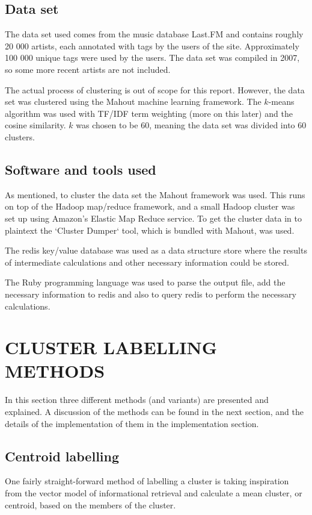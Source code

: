 \documentclass[letterpaper, 10 pt, conference]{ieeeconf}
\begin{document}
\subsection{Data set}
The data set used comes from the music database Last.FM and contains roughly
20 000 artists, each annotated with tags by the users of the site. Approximately
100 000 unique tags were used by the users. The data set was compiled in 2007,
so some more recent artists are not included.\cite{Lamere2010LastFm}

The actual process of clustering is out of scope for this report. However, the
data set was clustered using the Mahout machine learning framework. The
$k$-means algorithm was used with TF/IDF term weighting (more on this later) and
the cosine similarity. $k$ was chosen to be 60, meaning the data set was
divided into 60 clusters.

\subsection{Software and tools used}
As mentioned, to cluster the data set the Mahout framework was used. This runs
on top of the Hadoop map/reduce framework, and a small Hadoop cluster was set up
using Amazon's Elastic Map Reduce service. To get the cluster data in to
plaintext the `Cluster Dumper` tool, which is bundled with Mahout, was used.

The redis key/value database was used as a data structure store where the
results of intermediate calculations and other necessary information could be
stored.

The Ruby programming language was used to parse the output file, add the
necessary information to redis and also to query redis to perform the necessary
calculations.

\section{CLUSTER LABELLING METHODS}
In this section three different methods (and variants) are presented and
explained. A discussion of the methods can be found in the next section, and the
details of the implementation of them in the implementation section.

\subsection{Centroid labelling}

One fairly straight-forward method of labelling a cluster is taking inspiration
from the vector model of informational retrieval and calculate a mean cluster,
or centroid, based on the members of the cluster.
\end{document}
